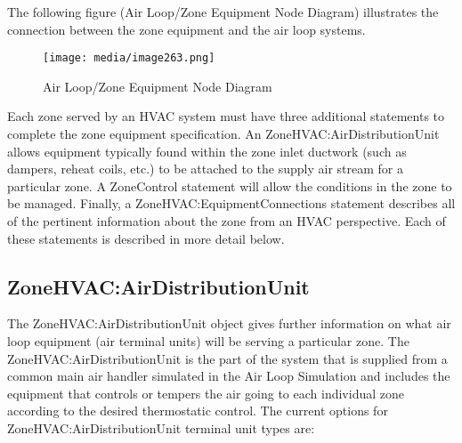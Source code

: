 The following figure (Air Loop/Zone Equipment Node Diagram) illustrates the connection between the zone equipment and the air loop systems.

\begin{figure}[hbtp] %
\centering
\texttt{[image: media/image263.png]}
\caption{Air Loop/Zone Equipment Node Diagram \protect \label{fig:air-loopzone-equipment-node-diagram}}
\end{figure}

Each zone served by an HVAC system must have three additional statements to complete the zone equipment specification. An ZoneHVAC:AirDistributionUnit allows equipment typically found within the zone inlet ductwork (such as dampers, reheat coils, etc.) to be attached to the supply air stream for a particular zone. A ZoneControl statement will allow the conditions in the zone to be managed. Finally, a ZoneHVAC:EquipmentConnections statement describes all of the pertinent information about the zone from an HVAC perspective. Each of these statements is described in more detail below.

\subsection{ZoneHVAC:AirDistributionUnit}\label{zonehvacairdistributionunit}

The ZoneHVAC:AirDistributionUnit object gives further information on what air loop equipment (air terminal units) will be serving a particular zone. The ZoneHVAC:AirDistributionUnit is the part of the system that is supplied from a common main air handler simulated in the Air Loop Simulation and includes the equipment that controls or tempers the air going to each individual zone according to the desired thermostatic control. The current options for ZoneHVAC:AirDistributionUnit terminal unit types are:

